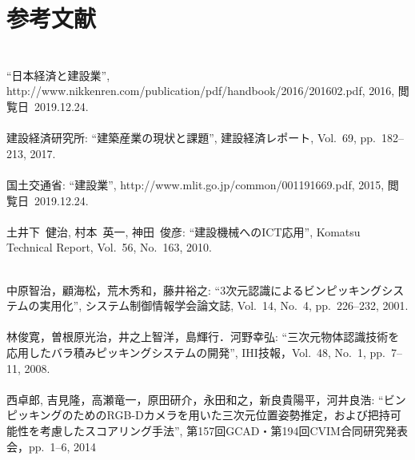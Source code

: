 \chapter*{参考文献}
\lhead[参考文献]{}
\thispagestyle{empty}

\newpage

\subsection*{}
\begin{mythebibliography}{}

\leavevmode\\
\newblock ``日本経済と建設業'',
\newblock http://www.nikkenren.com/publication/pdf/handbook/2016/201602.pdf, 2016, 閲覧日~2019.12.24.
\\

\leavevmode \\建設経済研究所:
\newblock ``建築産業の現状と課題'',
\newblock 建設経済レポート, Vol.~69, pp.~182--213, 2017.
\\
\leavevmode \\国土交通省:
\newblock ``建設業'',
\newblock http://www.mlit.go.jp/common/001191669.pdf, 2015, 閲覧日~2019.12.24.
\\
\leavevmode \\土井下~健治, 村本~英一, 神田~俊彦:
\newblock ``建設機械へのICT応用'',
\newblock Komatsu Technical Report, Vol.~56, No.~163, 2010.
\\
\newpage

\leavevmode \\中原智治，顧海松，荒木秀和，藤井裕之:
\newblock ``3次元認識によるビンピッキングシステムの実用化'',
\newblock システム制御情報学会論文誌, Vol.~14, No.~4, pp.~226--232, 2001.
\\
\leavevmode \\林俊寛，曽根原光治，井之上智洋，島輝行．河野幸弘:
\newblock ``三次元物体認識技術を応用したバラ積みピッキングシステムの開発'',
\newblock IHI技報，Vol.~48, No.~1, pp.~7--11, 2008.
\\
\leavevmode \\西卓郎, 吉見隆，高瀬竜一，原田研介，永田和之，新良貴陽平，河井良浩:
\newblock ``ビンピッキングのためのRGB-Dカメラを用いた三次元位置姿勢推定，および把持可能性を考慮したスコアリング手法'',
\newblock 第157回GCAD・第194回CVIM合同研究発表会，pp.~1--6, 2014
\\


\end{mythebibliography}
